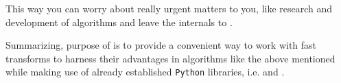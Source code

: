 This way you can worry about really urgent matters to you, like research and
development of algorithms and leave the internals to \fm{}.

Summarizing, purpose of \fm{} is to provide a convenient way to work with fast
transforms to harness their advantages in algorithms like the above mentioned
while making use of already established \texttt{Python} libraries, i.e. \np{}
and \scip{}.
